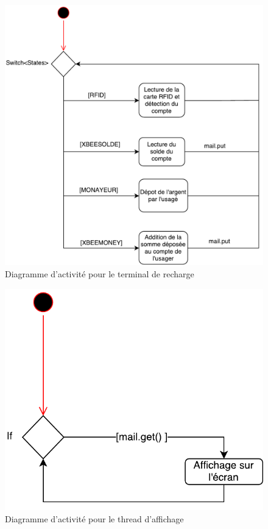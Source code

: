 \begin{figure}[hp]
	\centering
		\includegraphics[width=\textwidth]{Pictures/UML_recharge.pdf}
		\caption{Diagramme d'activité pour le terminal de recharge}
		\label{fig.2}
\end{figure}

\begin{figure}[hp]
	\centering
		\includegraphics[width=\textwidth]{Pictures/UML_affichage.pdf}
		\caption{Diagramme d'activité pour le thread d'affichage}
		\label{fig.3}
\end{figure}


